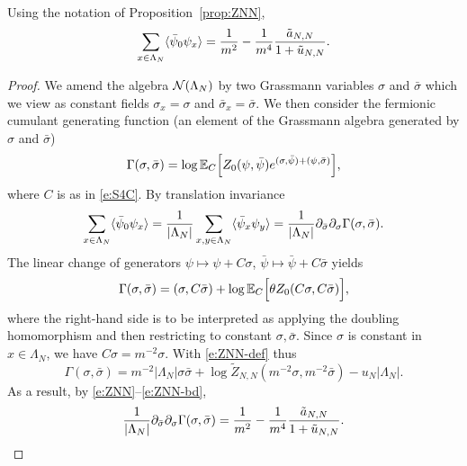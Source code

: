 \documentclass[11pt]{amsart}
\numberwithin{equation}{section}
\numberwithin{theorem}{section}
\newcommand{\1}{{\bf 1}}
\begin{document}
\begin{proposition} \label{prop:suscept}
  Using the notation of Proposition~\ref{prop:ZNN},
  \begin{equation} \label{e:suscept-atilde}
    \sum_{x\in\Lambda_N} \langle \bar\psi_0\psi_x \rangle = \frac{1}{m^2} 
    - \frac{1}{m^4} 
    \frac{\tilde a_{N,N}}{1+\tilde u_{N,N}}
    .
  \end{equation}
\end{proposition}

\begin{proof} 
  We amend the algebra $\mathcal N(\Lambda_{N})$ by two Grassmann variables $\sigma$ and $\bar\sigma$ which we view as constant fields
  $\sigma_x=\sigma$ and $\bar\sigma_x=\bar\sigma$. We then consider
  the fermionic cumulant generating function (an element of the
  Grassmann algebra generated by $\sigma$ and $\bar\sigma$) 
  \begin{equation} \label{e:Gammadef}
    \Gamma(\sigma,\bar\sigma)= \log \mathbb{E}_{C}\Bigl[{Z_0(\psi,\bar\psi)e^{(\sigma,\bar\psi)+(\psi,\bar\sigma)}}\Bigr],
  \end{equation}
  where $C$ is as in \eqref{e:S4C}. By translation invariance
  \begin{equation}
    \sum_{x\in\Lambda_{N}}\langle \bar\psi_0\psi_x \rangle
    = \frac{1}{|\Lambda_{N}|}\sum_{x,y\in\Lambda_N}\langle \bar\psi_x\psi_y \rangle
    = \frac{1}{|\Lambda_{N}|} \partial_{\bar\sigma}\partial_{\sigma}
    \Gamma(\sigma,\bar\sigma).
  \end{equation}
  The linear change of generators $\psi\mapsto \psi+C\sigma$, $\bar\psi\mapsto
  \bar\psi + C\bar\sigma$ yields
  \begin{equation} 
    \Gamma(\sigma,\bar\sigma)= (\sigma,C\bar\sigma) +
    \log \mathbb{E}_{C}\Bigl[{\theta Z_{0}(C\sigma,C\bar\sigma)}\Bigr],
  \end{equation}
  where the right-hand side is to be interpreted as applying
  the doubling homomorphism and then restricting to constant $\sigma,\bar\sigma$.
  Since $\sigma$ is constant in $x\in\Lambda_N$, we have $C\sigma = m^{-2} \sigma$.
  With \eqref{e:ZNN-def} thus
  \begin{equation} \label{e:Gammasquare}
    \Gamma(\sigma,\bar\sigma)= m^{-2}|\Lambda_{N}|\sigma\bar\sigma
    + \log \tilde Z_{N,N}(m^{-2}\sigma,m^{-2}\bar\sigma) - u_N|\Lambda_N|.
  \end{equation}
  As a result, by \eqref{e:ZNN}--\eqref{e:ZNN-bd}, 
  \begin{equation}
    \frac{1}{|\Lambda_{N}|}\partial_{\bar\sigma} \partial_{\sigma}\Gamma(\sigma,\bar\sigma)
    =  
    \frac{1}{m^2}
    - \frac{1}{m^4} 
    \frac{\tilde a_{N,N}}{1+\tilde u_{N,N}} .\qedhere
  \end{equation}
\end{proof}
\end{document}
